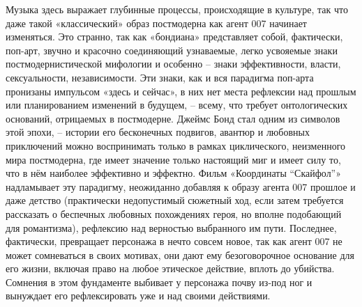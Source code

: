 Музыка здесь выражает глубинные процессы, происходящие в культуре, так что даже такой «классический» образ постмодерна как агент 007 начинает изменяться.
Это странно, так как «бондиана» представляет собой, фактически, поп-арт, звучно и красочно соединяющий узнаваемые, легко усвояемые знаки постмодернистической мифологии и особенно -- знаки эффективности, власти, сексуальности, независимости.
Эти знаки, как и вся парадигма поп-арта пронизаны импульсом «здесь и сейчас», в них нет места рефлексии над прошлым или планированием изменений в будущем, -- всему, что требует онтологических оснований, отрицаемых в постмодерне.
Джеймс Бонд стал одним из символов этой эпохи, -- истории его бесконечных подвигов, авантюр и любовных приключений можно воспринимать только в рамках циклического, неизменного мира постмодерна, где имеет значение только настоящий миг и имеет силу то, что в нём наиболее эффективно и эффектно.
Фильм «Координаты ``Скайфол''» надламывает эту парадигму, неожиданно добавляя к образу агента 007 прошлое и даже детство (практически недопустимый сюжетный ход, если затем требуется рассказать о беспечных любовных похождениях героя, но вполне подобающий для романтизма), рефлексию над верностью выбранного им пути.
Последнее, фактически, превращает персонажа в нечто совсем новое, так как агент 007 не может сомневаться в своих мотивах, они дают ему безоговорочное основание для его жизни, включая право на любое этическое действие, вплоть до убийства.
Сомнения в этом фундаменте выбивает у персонажа почву из-под ног и вынуждает его рефлексировать уже и над своими действиями.
